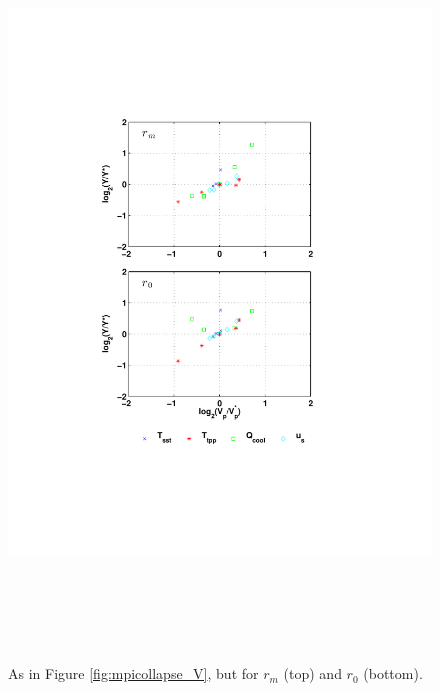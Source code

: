 \documentclass[12pt]{article}
\begin{document}
\begin{figure}[h!]
\centering
  \noindent\includegraphics[width=15cm,height=20cm]{FIGURES/MPI_collapse_r.pdf}
\caption{As in Figure \ref{fig:mpicollapse_V}, but for $r_m$ (top) and $r_0$ (bottom).}
\label{fig:mpicollapse_r}
\end{figure}
\end{document}
